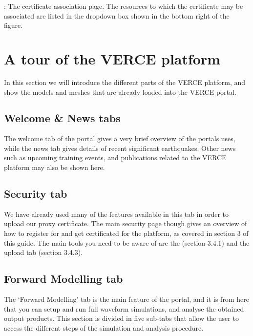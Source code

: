 \documentclass[english]{book}
\begin{document}

: The certificate association page. The resources to
which the certificate may be associated are listed in the dropdown box
shown in the bottom right of the figure.


\chapter{A tour of the VERCE platform}
\label{\detokenize{Section4:a-tour-of-the-verce-platform}}\label{\detokenize{Section4::doc}}
In this section we will introduce the different parts of the VERCE
platform, and show the models and meshes that are already loaded into
the VERCE portal.


\section{Welcome \& News tabs}
\label{\detokenize{Section4:welcome-news-tabs}}

The welcome tab of the portal gives a very brief overview of the portals
uses, while the news tab gives details of recent significant
earthquakes. Other news such as upcoming training events, and
publications related to the VERCE platform may also be shown here.


\section{Security tab}
\label{\detokenize{Section4:security-tab}}

We have already used many of the features available in this tab in order
to upload our proxy certificate. The main security page though gives an
overview of how to register for and get certificated for the platform,
as covered in section 3 of this guide. The main tools you need to be
aware of are the  (section 3.4.1) and the
 upload tab (section 3.4.3).


\section{Forward Modelling tab}
\label{\detokenize{Section4:forward-modelling-tab}}

The ‘Forward Modelling’ tab is the main feature of the portal, and it is
from here that you can setup and run full waveform simulations, and
analyse the obtained output products. This section is divided in five
sub-tabs that allow the user to access the different steps of the
simulation and analysis procedure.
\end{document}
